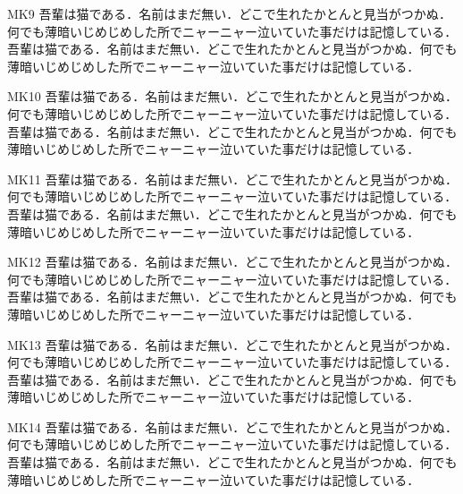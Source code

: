 \documentclass[fontsize=10pt,twocolumn]{jlreq}
\begin{document}
MK9 吾輩は猫である．名前はまだ無い．どこで生れたかとんと見当がつかぬ．何でも薄暗いじめじめした所でニャーニャー泣いていた事だけは記憶している． 吾輩は猫である．名前はまだ無い．どこで生れたかとんと見当がつかぬ．何でも薄暗いじめじめした所でニャーニャー泣いていた事だけは記憶している．\par
{}MK10 吾輩は猫である．名前はまだ無い．どこで生れたかとんと見当がつかぬ．何でも薄暗いじめじめした所でニャーニャー泣いていた事だけは記憶している． 吾輩は猫である．名前はまだ無い．どこで生れたかとんと見当がつかぬ．何でも薄暗いじめじめした所でニャーニャー泣いていた事だけは記憶している．\par
{}MK11 吾輩は猫である．名前はまだ無い．どこで生れたかとんと見当がつかぬ．何でも薄暗いじめじめした所でニャーニャー泣いていた事だけは記憶している． 吾輩は猫である．名前はまだ無い．どこで生れたかとんと見当がつかぬ．何でも薄暗いじめじめした所でニャーニャー泣いていた事だけは記憶している．\par
{}MK12 吾輩は猫である．名前はまだ無い．どこで生れたかとんと見当がつかぬ．何でも薄暗いじめじめした所でニャーニャー泣いていた事だけは記憶している． 吾輩は猫である．名前はまだ無い．どこで生れたかとんと見当がつかぬ．何でも薄暗いじめじめした所でニャーニャー泣いていた事だけは記憶している．\par
{}MK13 吾輩は猫である．名前はまだ無い．どこで生れたかとんと見当がつかぬ．何でも薄暗いじめじめした所でニャーニャー泣いていた事だけは記憶している． 吾輩は猫である．名前はまだ無い．どこで生れたかとんと見当がつかぬ．何でも薄暗いじめじめした所でニャーニャー泣いていた事だけは記憶している．\par
{}MK14 吾輩は猫である．名前はまだ無い．どこで生れたかとんと見当がつかぬ．何でも薄暗いじめじめした所でニャーニャー泣いていた事だけは記憶している． 吾輩は猫である．名前はまだ無い．どこで生れたかとんと見当がつかぬ．何でも薄暗いじめじめした所でニャーニャー泣いていた事だけは記憶している．\par
\end{document}
